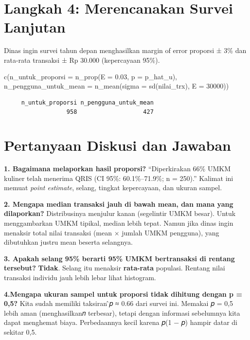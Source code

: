 \documentclass[
  indonesian,
  letterpaper,
]{book}
\newenvironment{Shaded}{\begin{snugshade}}{\end{snugshade}}
\newcommand{\AttributeTok}[1]{\textcolor[rgb]{0.40,0.45,0.13}{#1}}
\newcommand{\DecValTok}[1]{\textcolor[rgb]{0.68,0.00,0.00}{#1}}
\newcommand{\FloatTok}[1]{\textcolor[rgb]{0.68,0.00,0.00}{#1}}
\newcommand{\FunctionTok}[1]{\textcolor[rgb]{0.28,0.35,0.67}{#1}}
\newcommand{\NormalTok}[1]{\textcolor[rgb]{0.00,0.23,0.31}{#1}}
\begin{document}
\section{Langkah 4: Merencanakan Survei
Lanjutan}\label{langkah-4-merencanakan-survei-lanjutan}

Dinas ingin survei tahun depan menghasilkan margin of error proporsi ±
3\% dan rata-rata transaksi ± Rp 30.000 (kepercayaan 95\%).

\begin{Shaded}
\begin{Highlighting}[]
\FunctionTok{c}\NormalTok{(}\AttributeTok{n\_untuk\_proporsi =} \FunctionTok{n\_prop}\NormalTok{(}\AttributeTok{E =} \FloatTok{0.03}\NormalTok{, }\AttributeTok{p =}\NormalTok{ p\_hat\_u),}
\AttributeTok{n\_pengguna\_untuk\_mean =} \FunctionTok{n\_mean}\NormalTok{(}\AttributeTok{sigma =} \FunctionTok{sd}\NormalTok{(nilai\_trx), }\AttributeTok{E =} \DecValTok{30000}\NormalTok{))}
\end{Highlighting}
\end{Shaded}

\begin{verbatim}
     n_untuk_proporsi n_pengguna_untuk_mean 
                  958                   427 
\end{verbatim}

\section{Pertanyaan Diskusi dan
Jawaban}\label{pertanyaan-diskusi-dan-jawaban}

\textbf{1. Bagaimana melaporkan hasil proporsi?} ``Diperkirakan 66\%
UMKM kuliner telah menerima QRIS (CI 95\%: 60.1\%--71.9\%; n = 250).''
Kalimat ini memuat \emph{point estimate}, selang, tingkat kepercayaan,
dan ukuran sampel.

\textbf{2. Mengapa median transaksi jauh di bawah mean, dan mana yang
dilaporkan?} Distribusinya menjulur kanan (segelintir UMKM besar). Untuk
menggambarkan UMKM tipikal, median lebih tepat. Namun jika dinas ingin
menaksir total nilai transaksi (mean × jumlah UMKM pengguna), yang
dibutuhkan justru mean beserta selangnya.

\textbf{3. Apakah selang 95\% berarti 95\% UMKM bertransaksi di rentang
tersebut?} \textbf{Tidak}. Selang itu menaksir \textbf{rata-rata}
populasi. Rentang nilai transaksi individu jauh lebih lebar lihat
histogram.

\textbf{4.Mengapa ukuran sampel untuk proporsi tidak dihitung dengan p =
0,5?} Kita sudah memiliki taksiran ̂𝑝 ≈ 0.66 dari survei ini. Memakai 𝑝
= 0,5 lebih aman (menghasilkan𝑛 terbesar), tetapi dengan informasi
sebelumnya kita dapat menghemat biaya. Perbedaannya kecil karena 𝑝(1 −
𝑝) hampir datar di sekitar 0,5.
\end{document}
